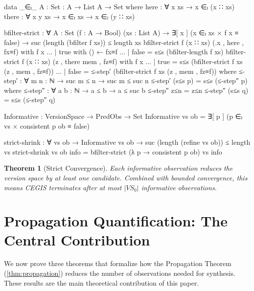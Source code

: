 \documentclass[9pt,a4paper]{article}
\theoremstyle{plain}
\newtheorem{theorem}{Theorem}
\theoremstyle{definition}
\theoremstyle{remark}
\begin{document}
\begin{code}
    data _∈ₗ_ {A : Set} : A → List A → Set where
      here  : ∀ {x xs} → x ∈ₗ (x ∷ xs)
      there : ∀ {x y xs} → x ∈ₗ xs → x ∈ₗ (y ∷ xs)

    bfilter-strict : ∀ {A : Set} (f : A → Bool) (xs : List A) →
      ∃[ x ] (x ∈ₗ xs × f x ≡ false) →
      suc (length (bfilter f xs)) ≤ length xs
    bfilter-strict f (x ∷ xs) (.x , here , fx≡f) with f x
    ... | true  with () ← fx≡f
    ... | false = s≤s (bfilter-length f xs)
    bfilter-strict f (x ∷ xs) (z , there mem , fz≡f) with f x
    ... | true  = s≤s (bfilter-strict f xs (z , mem , fz≡f))
    ... | false = ≤-step′ (bfilter-strict f xs (z , mem , fz≡f))
      where
        ≤-step′ : ∀ {m n : ℕ} → suc m ≤ n → suc m ≤ suc n
        ≤-step′ (s≤s p) = s≤s (≤-step″ p)
          where
            ≤-step″ : ∀ {a b : ℕ} → a ≤ b → a ≤ suc b
            ≤-step″ z≤n     = z≤n
            ≤-step″ (s≤s q) = s≤s (≤-step″ q)

    Informative : VersionSpace → PredObs → Set
    Informative vs ob = ∃[ p ] (p ∈ₗ vs × consistent p ob ≡ false)

    strict-shrink : ∀ vs ob →
      Informative vs ob →
      suc (length (refine vs ob)) ≤ length vs
    strict-shrink vs ob info =
      bfilter-strict (λ p → consistent p ob) vs info
\end{code}

\begin{theorem}[Strict Convergence]
Each informative observation reduces the version space by at least one candidate.  Combined with bounded convergence, this means CEGIS terminates after at most $|\mathit{VS}_0|$ informative observations.
\end{theorem}



\section{Propagation Quantification: The Central Contribution}
\label{sec:propagation}

We now prove three theorems that formalize how the Propagation Theorem (\ref{thm:propagation}) reduces the number of observations needed for synthesis.  These results are the main theoretical contribution of this paper.
\end{document}
